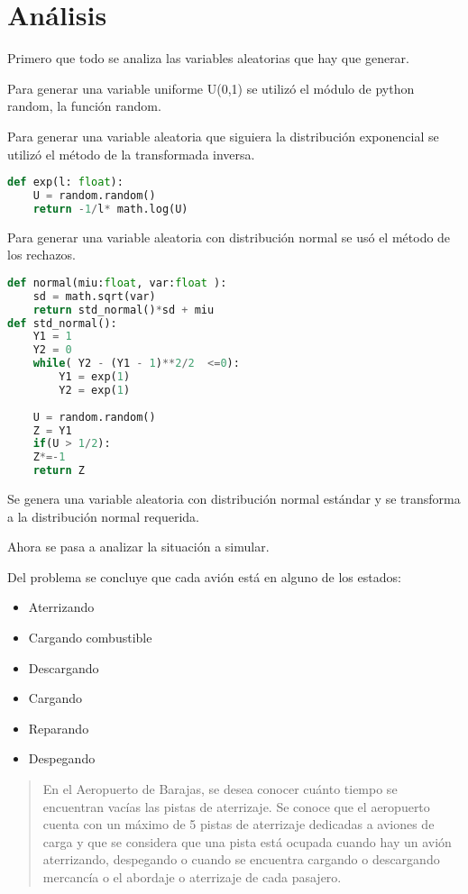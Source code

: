 \documentclass[12pt,letterpaper]{article}
\begin{document}
\section*{An\'alisis}

Primero que todo se analiza las variables aleatorias que hay que generar.

Para generar una variable uniforme U(0,1) se utiliz\'o el m\'odulo de python random, la funci\'on random.

Para generar una variable aleatoria que siguiera la distribuci\'on exponencial se utiliz\'o el m\'etodo de la transformada inversa.
\begin{lstlisting}[language=Python,caption= Variable con distribucion exponencial]
def exp(l: float):
	U = random.random()
	return -1/l* math.log(U)
\end{lstlisting}

Para generar una variable aleatoria con distribuci\'on normal se us\'o el m\'etodo de los rechazos.
\begin{lstlisting}[language=Python,caption= Variable con distribucion normal]
def normal(miu:float, var:float ):
	sd = math.sqrt(var)
	return std_normal()*sd + miu
def std_normal():
	Y1 = 1
	Y2 = 0
	while( Y2 - (Y1 - 1)**2/2  <=0):
		Y1 = exp(1)
		Y2 = exp(1)
	
	U = random.random()
	Z = Y1
	if(U > 1/2):
	Z*=-1
	return Z
\end{lstlisting}

Se genera una variable aleatoria con distribuci\'on normal est\'andar y se transforma a la distribuci\'on normal requerida.

Ahora se pasa a analizar la situaci\'on a simular.

Del problema se concluye que cada avi\'on est\'a en alguno de los estados:
\begin{itemize}
	\item Aterrizando
	\item Cargando combustible
	\item Descargando
	\item Cargando
	\item Reparando
	\item Despegando
\end{itemize}

\begin{quote}
	En el Aeropuerto de Barajas, se desea conocer cuánto tiempo se encuentran vac\'ias las pistas de aterrizaje. Se conoce que el aeropuerto cuenta con un máximo de 5 pistas de aterrizaje dedicadas a aviones de carga y que se considera que una pista está ocupada cuando hay un avión aterrizando, despegando o cuando se encuentra cargando o descargando mercanc\'ia o el abordaje o aterrizaje de cada pasajero.
\end{quote}
\end{document}
